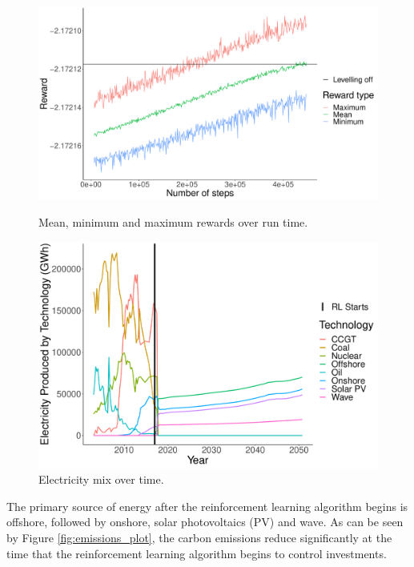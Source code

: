\documentclass{article}
\begin{document}
\begin{figure}
\centering
\begin{minipage}{.4\textwidth}
  \centering
  \includegraphics[width=\linewidth]{figures/runtime_steps_plot.pdf}
  \caption{Mean, minimum and maximum rewards over run time.}
  \label{fig:days_reward_plot}
\end{minipage}%
\begin{minipage}{.4\textwidth}
  \centering
  \includegraphics[width=\linewidth]{figures/electricity_generated_plot.pdf}
  \caption{Electricity mix over time.}
  \label{fig:electricity_generated_plot}
\end{minipage}
\end{figure}

The primary source of energy after the reinforcement learning algorithm begins is offshore, followed by onshore, solar photovoltaics (PV) and wave. As can be seen by Figure \ref{fig:emissions_plot}, the carbon emissions reduce significantly at the time that the reinforcement learning algorithm begins to control investments. 
\end{document}
